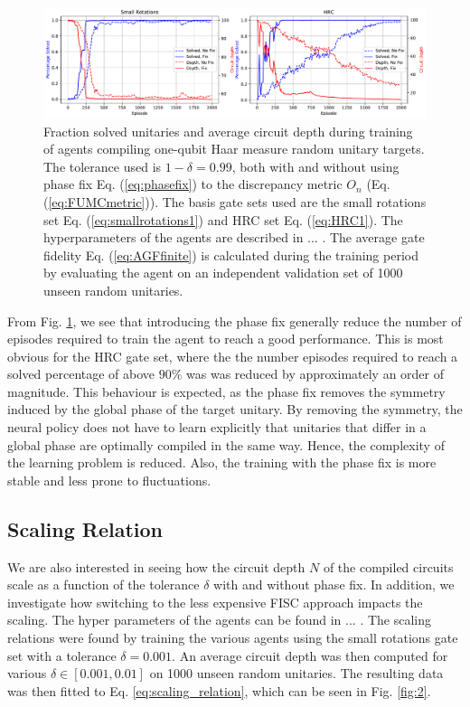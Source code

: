\documentclass[%
 aip,
 floatfix,
 amsmath,amssymb,
 reprint,%
]{revtex4-1}
\begin{document}
\begin{figure}[h]
\includegraphics[width=1\textwidth]{../figures/one_qubit_fixvsnofix}
\caption{Fraction solved unitaries and average circuit depth during training of agents compiling one-qubit Haar measure random unitary targets. The tolerance used is $1-\delta = 0.99$, both with and without using phase fix Eq. (\ref{eq:phasefix}) to the discrepancy metric $O_n$ (Eq. (\ref{eq:FUMCmetric})). The basis gate sets used are the small rotations set Eq. (\ref{eq:smallrotations1}) and HRC set Eq. (\ref{eq:HRC1}). The hyperparameters of the agents are described in ... . The average gate fidelity Eq. (\ref{eq:AGFfinite}) is calculated during the training period by evaluating the agent on an independent validation set of 1000 unseen random unitaries.} \label{fig:1}
\end{figure}

From Fig. \ref{fig:1}, we see that introducing the phase fix generally reduce the number of episodes required to train the agent to reach a good performance. This is most obvious for the HRC gate set, where the the number episodes required to reach a solved percentage of above $90\%$ was was reduced by approximately an order of magnitude. This behaviour is expected, as the phase fix removes the symmetry induced by the global phase of the target unitary. By removing the symmetry, the neural policy does not have to learn explicitly that unitaries that differ in a global phase are optimally compiled in the same way. Hence, the complexity of the learning problem is reduced. Also, the training with the phase fix is more stable and less prone to fluctuations.

\subsection{Scaling Relation}

We are also interested in seeing how the circuit depth $N$ of the compiled circuits scale as a function of the tolerance $\delta$ with and without phase fix. In addition, we investigate how switching to the less expensive FISC approach impacts the scaling. The hyper parameters of the agents can be found in ... . The scaling relations were found by training the various agents using the small rotations gate set with a tolerance $\delta = 0.001$. An average circuit depth was then computed for various $\delta \in [0.001, 0.01]$ on 1000 unseen random unitaries.
The resulting data was then fitted to Eq. \ref{eq:scaling_relation}, which can be seen in Fig. \ref{fig:2}.
\end{document}
